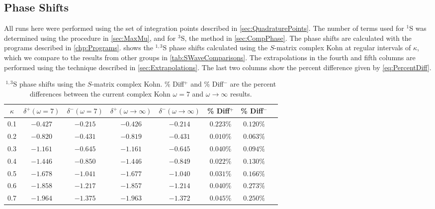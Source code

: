 \documentclass[Dissertation.tex]{subfiles}
\begin{document}
\subsection{Phase Shifts}
\label{sec:SWavePhase}

All runs here were performed using the set of integration points described in 
\cref{sec:QuadraturePoints}. The number of terms used for $^1$S was determined
using the procedure in \cref{sec:MaxMu}, and for $^3$S, the method in
\cref{sec:CompPhase}. The phase shifts are calculated with the programs 
described in \cref{chp:Programs}.  shows the $^{1,3}$S phase shifts 
calculated using the $S$-matrix complex Kohn at regular intervals of $\kappa$, which we 
compare to the results from other groups in \cref{tab:SWaveComparisons}. 
The extrapolations in the fourth and fifth columns are performed using the 
technique described in \cref{sec:Extrapolations}. The last two columns show 
the percent difference given by \cref{eq:PercentDiff}.

\begin{table}
\centering
\begin{tabular}{c c c c c c c c}
\toprule
$\kappa$ & $\delta^+ (\omega = 7)$ & $\delta^- (\omega = 7)$ & $\delta^+ (\omega \rightarrow \infty)$ & $\delta^- (\omega \rightarrow \infty)$ & \% Diff$^+$ & \% Diff$^-$ \\
\midrule
0.1 & $-0.427$ & $-0.215$ & $-0.426$ & $-0.214$ & $0.223\%$ & $0.120\%$ \\
0.2 & $-0.820$ & $-0.431$ & $-0.819$ & $-0.431$ & $0.010\%$ & $0.063\%$ \\
0.3 & $-1.161$ & $-0.645$ & $-1.161$ & $-0.645$ & $0.040\%$ & $0.094\%$ \\
0.4 & $-1.446$ & $-0.850$ & $-1.446$ & $-0.849$ & $0.022\%$ & $0.130\%$ \\
0.5 & $-1.678$ & $-1.041$ & $-1.677$ & $-1.040$ & $0.031\%$ & $0.166\%$ \\
0.6 & $-1.858$ & $-1.217$ & $-1.857$ & $-1.214$ & $0.040\%$ & $0.273\%$ \\
0.7 & $-1.964$ & $-1.375$ & $-1.963$ & $-1.372$ & $0.045\%$ & $0.250\%$ \\
\bottomrule
\end{tabular}
\caption[$^{1,3}$S complex Kohn phase shifts]{$^{1,3}$S phase shifts using the $S$-matrix complex Kohn. \% Diff$^+$ and \% Diff$^-$ are the percent differences between the
 current complex Kohn $\omega = 7$ and $\omega \rightarrow \infty$ results.}
\label{tab:SWavePhase}
\end{table}
\end{document}
